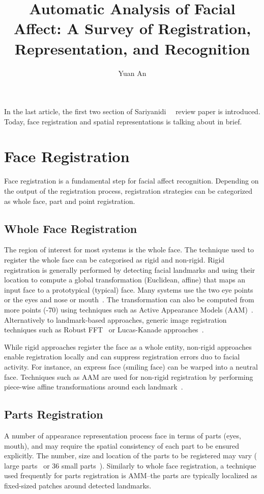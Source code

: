 \documentclass[10pt,twocolumn,letterpaper]{article}
\begin{document}
	\title{Automatic Analysis of Facial Affect: A Survey of Registration, Representation, and Recognition}	
	\author{Yuan An}
	\maketitle
	In the last article, the first two section of Sariyanidi~\etal~\cite{Auto} review paper is introduced. Today, face registration and spatial representations is talking about in brief.
	\section*{Face Registration}
	Face registration is a fundamental step for facial affect recognition. Depending on the output of the registration process, registration strategies can be categorized as whole face, part and point registration.
	\subsection*{Whole Face Registration}
	The region of interest for most systems is the whole face. The technique used to register the whole face can be categorised as rigid and non-rigid.
	Rigid registration is generally performed by detecting facial landmarks and using their location to compute a global transformation (\eg Euclidean, affine) that maps an input face to a prototypical (typical) face. Many systems use the two eye points or the eyes and nose or mouth~\cite{Jiang,Littlewort}. The transformation can also be computed from more points (-70) using techniques such as Active Appearance Models (AAM)~\cite{Cootes}. Alternatively to landmark-based approaches, generic image registration techniques such as Robust FFT~\cite{RobustFFT} or Lucas-Kanade approaches~\cite{Baker2004}.
	\par
	While rigid approaches register the face as a whole entity, non-rigid approaches enable registration locally and can suppress registration errors duo to facial activity. For instance, an express face (\eg smiling face) can be warped into a neutral face. Techniques such as AAM are used for non-rigid registration by performing piece-wise affine transformations around each landmark~\cite{LUCEY2012197}.
	\subsection*{Parts Registration}
	A number of appearance representation process face in terms of parts (\eg eyes, mouth), and may require the spatial consistency of each part to be ensured explicitly. The number, size and location of the parts to be registered may vary ( large parts~\cite{Tong} or 36 small parts~\cite{Zhu}). Similarly to whole face registration, a technique used frequently for parts registration is AMM--the parts are typically localized as fixed-sized patches around detected landmarks.
\end{document}
